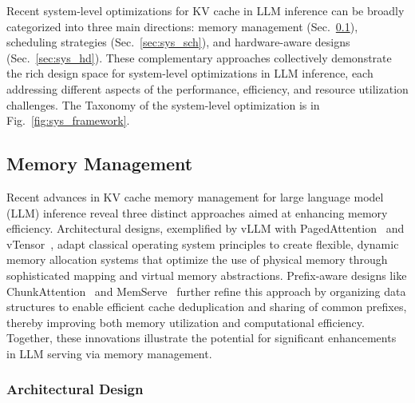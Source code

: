 \begin{figure*}[h]
\caption{Taxonomy of the System-level Optimization for KV Cache Management.}
\label{fig:sys_framework}
\end{figure*}



Recent system-level optimizations for KV cache in LLM inference can be broadly categorized into three main directions: memory management (Sec.~\ref{sec:sys_mm}), scheduling strategies (Sec.~\ref{sec:sys_sch}), and hardware-aware designs (Sec.~\ref{sec:sys_hd}). These complementary approaches collectively demonstrate the rich design space for system-level optimizations in LLM inference, each addressing different aspects of the performance, efficiency, and resource utilization challenges. The Taxonomy of the system-level optimization is   in Fig.~\ref{fig:sys_framework}.

\subsection{Memory Management}\label{sec:sys_mm}

Recent advances in KV cache memory management for large language model (LLM) inference reveal three distinct approaches aimed at enhancing memory efficiency. Architectural designs, exemplified by vLLM with PagedAttention~\cite{DBLP:conf/sosp/KwonLZ0ZY0ZS23} and vTensor~\cite{xu2024vtensorflexiblevirtualtensor}, adapt classical operating system principles to create flexible, dynamic memory allocation systems that optimize the use of physical memory through sophisticated mapping and virtual memory abstractions. Prefix-aware designs like ChunkAttention~\cite{ye2024chunkattentionefficientselfattentionprefixaware} and MemServe~\cite{hu2024memservecontextcachingdisaggregated} further refine this approach by organizing data structures to enable efficient cache deduplication and sharing of common prefixes, thereby improving both memory utilization and computational efficiency. Together, these innovations illustrate the potential for significant enhancements in LLM serving via memory management.

\subsubsection{Architectural Design}\label{sec:sys_mm_ad} 

